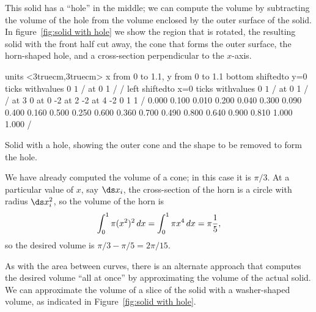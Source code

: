 \begin{solution}
This solid has a
``hole'' in the middle; we can compute the volume by subtracting the
volume of the hole from the volume enclosed by the outer surface of
the solid. In figure~\ref{fig:solid with hole} we show the region
that is rotated, the resulting solid with the front half cut away,
the cone that forms the outer surface, the
horn-shaped hole, and a cross-section perpendicular to the $x$-axis.

\figure[H]
\centerline{\vbox{\beginpicture
\normalgraphs
\setcoordinatesystem units <3truecm,3truecm>
\setplotarea x from 0 to 1.1, y from 0 to 1.1
\axis bottom shiftedto y=0 ticks withvalues {$0$} {$1$} / at 0 1 / /
\axis left shiftedto x=0 ticks withvalues {$0$} {$1$} / at 0 1 / /
 at 3 0
 at 0 -2
 at 2 -2
 at 4 -2
 0 1 1 /
\setquadratic
{} 0.000 0.100 0.010 0.200 0.040 0.300 0.090 0.400 0.160 
0.500 0.250 0.600 0.360 0.700 0.490 0.800 0.640 0.900 0.810 
1.000 1.000 /
\endpicture}}
\caption{\label{fig:solid with hole}
Solid with a hole, showing the outer cone and the shape to
be removed to form the hole.}
\endfigure

We have already computed the volume of a cone; in this case it is
$\pi/3$. At a particular value of $x$, say $\ds x_i$, the cross-section of
the horn is a circle with radius $\ds x_i^2$, so the volume of the horn is
$$\int_0^1 \pi(x^2)^2\,dx=\int_0^1 \pi x^4\,dx=\pi{1\over 5},$$
so the desired volume is $\pi/3-\pi/5=2\pi/15$.

As with the area between curves, there is an alternate approach that
computes the desired volume ``all at once'' by approximating the
volume of the actual solid. We can approximate the volume of a slice
of the solid with a washer-shaped volume, as indicated in
Figure~\ref{fig:solid with hole}.


\end{solution}
